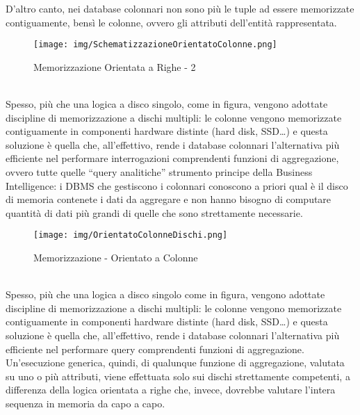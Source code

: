 \documentclass[a4paper,12pt]{report}
\begin{document}
D’altro canto, nei database colonnari non sono più le tuple ad essere memorizzate contiguamente, bensì le colonne, ovvero gli attributi dell’entità rappresentata.
\begin{figure}[h]
    \centering
    \texttt{[image: img/SchematizzazioneOrientatoColonne.png]}
    \caption{Memorizzazione Orientata a Righe - 2}
\end{figure}
\\[0ex]
Spesso, più che una logica a disco singolo, come in figura, vengono adottate discipline di memorizzazione a dischi multipli: le colonne vengono memorizzate contiguamente in componenti hardware distinte (hard disk, SSD…) e questa soluzione è quella che, all’effettivo, rende i database colonnari l’alternativa più efficiente nel performare interrogazioni comprendenti funzioni di aggregazione, ovvero tutte quelle “query analitiche” strumento principe della Business Intelligence: i DBMS che gestiscono i colonnari conoscono a priori qual è il disco di memoria contenete i dati da aggregare e non hanno bisogno di computare quantità di dati più grandi di quelle che sono strettamente necessarie.
\begin{figure}[h]
    \centering
    \texttt{[image: img/OrientatoColonneDischi.png]}
    \caption{Memorizzazione - Orientato a Colonne}
\end{figure}
\\[0ex]
Spesso, più che una logica a disco singolo come in figura, vengono adottate discipline di memorizzazione a dischi multipli: le colonne vengono memorizzate contiguamente in componenti hardware distinte (hard disk, SSD…) e questa soluzione è quella che, all’effettivo, rende i database colonnari l’alternativa più efficiente nel performare query comprendenti funzioni di aggregazione.
Un’esecuzione generica, quindi, di qualunque funzione di aggregazione, valutata su uno o più attributi, viene effettuata solo sui dischi strettamente competenti, a differenza della logica orientata a righe che, invece, dovrebbe valutare l’intera sequenza in memoria da capo a capo.
\\[0ex]
\end{document}
